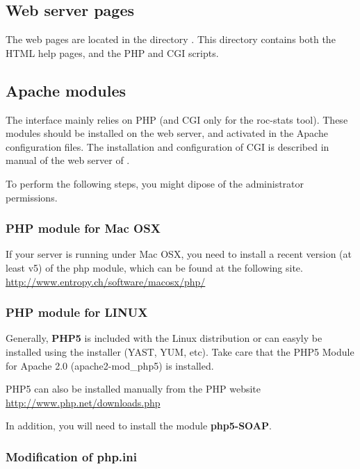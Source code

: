 \documentclass{book}
\begin{document}
\subsection{Web server pages}

The web pages are located in the directory
. This directory contains both the HTML help
pages, and the PHP and CGI scripts.

\subsection{Apache modules}

The \neat interface mainly relies on PHP (and CGI only for the roc-stats tool).
These modules should be installed on the web server, and activated in the Apache configuration files.
The installation and configuration of CGI is described in manual of the web server of \RSAT.

To perform the following steps, you might dipose of the administrator permissions.

\subsubsection{PHP module for Mac OSX}

If your server is running under Mac OSX, you need to install a recent
version (at least v5) of the php module, which can be found at the
following site. \\
\url{http://www.entropy.ch/software/macosx/php/}

\subsubsection{PHP module for LINUX}

Generally, \textbf{PHP5} is included with the Linux distribution or
can easyly be installed using the installer (YAST, YUM, etc). Take
care that the PHP5 Module for Apache 2.0 (apache2-mod\_php5) is
installed.

PHP5 can also be installed manually from the PHP website \\ 
\url{http://www.php.net/downloads.php}


In addition, you will need to install the module \textbf{php5-SOAP}.

\subsubsection{Modification of php.ini}
\end{document}
